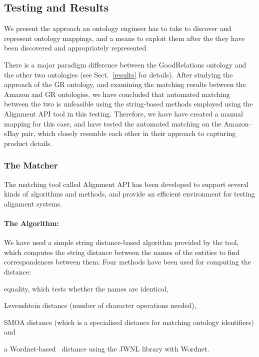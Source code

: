 \subsection{Testing and Results}
\label{testing}

We present the approach an ontology engineer has to take to discover and represent ontology mappings, and a means to exploit them after the they have been discovered and appropriately represented.

There is a major paradigm difference between the GoodRelations ontology and the other two ontologies (see Sect.~\ref{results} for details). After studying the approach of the GR ontology, and examining the matching results between the Amazon and GR ontologies, we have concluded that automated matching between the two is unfeasible using the string-based methods employed using the Alignment API tool in this testing. Therefore, we have have created a manual mapping for this case, and have tested the automated matching on the Amazon--eBay pair, which closely resemble each other in their approach to capturing product details.

\subsubsection{The Matcher}
The matching tool called Alignment API \cite{euzenat2004api} has been developed to support several kinds of algorithms and methods, and provide an efficient environment for testing alignment systems.

\paragraph{The Algorithm:}
We have used a simple string distance-based algorithm provided by the tool, which computes the string distance between the names of the entities to find correspondences between them. Four methods have been used for computing the distance:
\begin{inparaenum}[(1)]
    \item equality, which tests whether the names are identical, 
    \item Levenshtein distance (number of character operations needed), 
    \item SMOA distance (which is a specialised distance for matching ontology identifiers) and
    \item a Wordnet-based~\cite{fellbaum1998wordnet} distance using the JWNL library with Wordnet.
\end{inparaenum}


